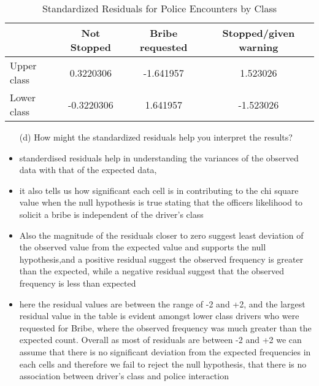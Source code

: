 \documentclass[12pt,letterpaper]{article}
\begin{document}
\begin{table}[h]
	\centering
	\begin{tabular}{l | c c c }
		& Not Stopped & Bribe requested & Stopped/given warning \\ \hline
		Upper class  & 0.3220306 & -1.641957 & 1.523026 \\
		Lower class  & -0.3220306 & 1.641957 & -1.523026 \\
	\end{tabular}
	\caption{Standardized Residuals for Police Encounters by Class}
\end{table}
\vspace{1cm}
\begin{enumerate}
\item [(d)] How might the standardized residuals help you interpret the results?
\end{enumerate}
\begin{itemize}
	\item standerdised residuals help in understanding the variances of the observed data with that of the expected data,
	\item it also tells us how significant each cell is in contributing to the chi square value 
	 when the null hypothesis is true stating that the officers likelihood to solicit a bribe is independent of the driver's class
	 \item  Also the magnitude of the residuals closer to zero suggest least deviation of the observed value from the expected value and supports the null hypothesis,and a positive residual suggest the observed frequency is greater than the expected, while a negative residual suggest that the observed frequency is less than expected
	 \item here the residual values are between the range of -2 and +2,  and the largest residual value in the table is evident amongst lower class drivers who were requested for Bribe, where the observed frequency was much greater than the expected count. Overall as most of residuals are between -2 and +2 we can assume that there is no significant deviation from the expected frequencies in each cells and therefore we fail to reject the null hypothesis, that there is no association between driver's class and police interaction
\end{itemize} 
	
\newpage
\end{document}
